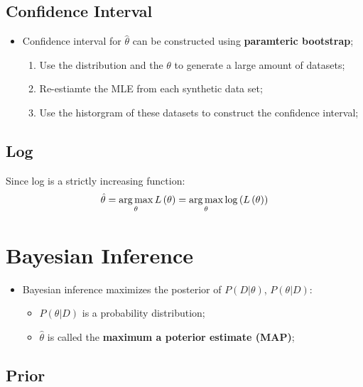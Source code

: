  \subsection{Confidence Interval}
  
    \begin{itemize}
      \item Confidence interval for $ \hat{\theta} $ can be constructed using \textbf{paramteric bootstrap};
      \begin{enumerate}
        \item Use the distribution and the $ \theta $ to generate a large amount of datasets;
        \item Re-estiamte the MLE from each synthetic data set;
        \item Use the historgram of these datasets to construct the confidence interval;
      \end{enumerate}
    \end{itemize}
    
  \subsection{Log}
  
    Since log is a strictly increasing function:
    \begin{equation}
      \hat{\theta} = \operatorname*{arg\,max}_{\theta} L\left(\theta\right) = \operatorname*{arg\,max}_{\theta} \log \left( L\left(\theta\right) \right)
    \end{equation}
    
\section{Bayesian Inference}

  \begin{itemize}
    \item Bayesian inference maximizes the posterior of $ P\left( D | \theta \right) $, $ P\left( \theta | D \right) $:
    \begin{itemize}
      \item $ P\left( \theta | D \right) $ is a probability distribution;
      \item $ \hat{\theta} $ is called the \textbf{maximum a poterior estimate (MAP)};
    \end{itemize}
  \end{itemize}
  
  \subsection{Prior}
  
